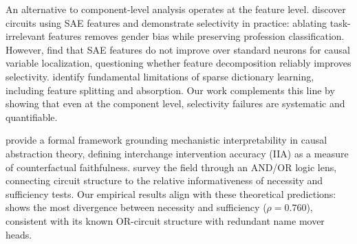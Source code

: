An alternative to component-level analysis operates at the feature level. \citet{marks2024sparse} discover circuits using SAE features and demonstrate selectivity in practice: ablating task-irrelevant features removes gender bias while preserving profession classification. However, \citet{mueller2025mib} find that SAE features do not improve over standard neurons for causal variable localization, questioning whether feature decomposition reliably improves selectivity. \citet{sharkey2025open} identify fundamental limitations of sparse dictionary learning, including feature splitting and absorption. Our work complements this line by showing that even at the component level, selectivity failures are systematic and quantifiable.

\citet{geiger2023causal} provide a formal framework grounding mechanistic interpretability in causal abstraction theory, defining interchange intervention accuracy (\textsc{IIA}) as a measure of counterfactual faithfulness. \citet{bereska2024review} survey the field through an AND/OR logic lens, connecting circuit structure to the relative informativeness of necessity and sufficiency tests. Our empirical results align with these theoretical predictions: \ioi shows the most divergence between necessity and sufficiency ($\rho = 0.760$), consistent with its known OR-circuit structure with redundant name mover heads.